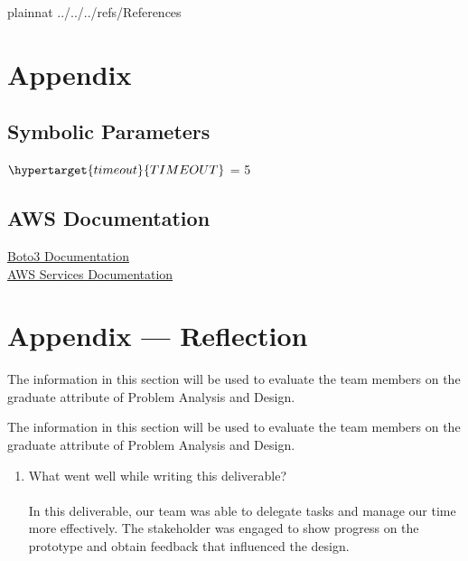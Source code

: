 \documentclass[12pt, titlepage]{article}
\begin{document}
{    \newpage

     {plainnat}
     {../../../refs/References}

    \newpage

    \section{Appendix} \label{Appendix}

    \subsection{Symbolic Parameters}
    $\hypertarget{timeout}{TIMEOUT}$ = 5\\

    \subsection{AWS Documentation}
    \href{https://boto3.amazonaws.com/v1/documentation/api/latest/index.html}{Boto3
    Documentation}\\
    \href{https://docs.aws.amazon.com/whitepapers/latest/aws-overview/amazon-web-services-cloud-platform.html}{AWS
    Services Documentation}

    \newpage{}

    \section*{Appendix --- Reflection}

    The information in this section will be used to evaluate the team
    members on the
    graduate attribute of Problem Analysis and Design.

    

    The information in this section will be used to evaluate the team
    members on the
    graduate attribute of Problem Analysis and Design.
    \begin{enumerate}
      \item What went well while writing this deliverable?
        \\
        \\
        In this deliverable, our team was able to delegate tasks and
        manage our time more effectively.
        The stakeholder was engaged to show progress on the prototype and
        obtain feedback that
        influenced the design.


\end{enumerate}}
\end{document}
